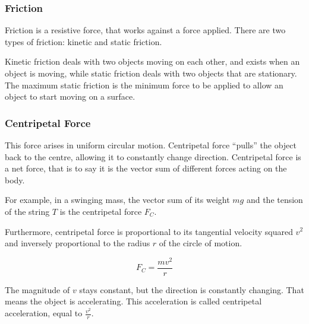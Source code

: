 \documentclass[../main.tex]{subfiles}
\begin{document}
			\subsubsection{Friction}
			Friction is a resistive force, that works against a force applied. There are two types of friction: kinetic and static friction. 
			
			Kinetic friction deals with two objects moving on each other, and exists when an object is moving, while static friction deals with two objects that are stationary. The maximum static friction is the minimum force to be applied to allow an object to start moving on a surface.
			\begin{center}
			\end{center}
		
			\subsubsection{Centripetal Force}
			
			This force arises in uniform circular motion. Centripetal force ``pulls'' the object back to the centre, allowing it to constantly change direction. Centripetal force is a net force, that is to say it is the vector sum of different forces acting on the body.

			For example, in a swinging mass, the vector sum of its weight \(mg\) and the tension of the string \(T\) is the centripetal force \(F_C\).

			Furthermore, centripetal force is proportional to its tangential velocity squared \(v^2\)and inversely proportional to the radius \(r\) of the circle of motion. 
			\begin{center}
			\end{center}
		
			\[F_C = \frac{mv^2}{r} \]
			
			The magnitude of \(v\) stays constant, but the direction is constantly changing. That means the object is accelerating. This acceleration is called centripetal acceleration, equal to \(\frac{v^2}{r}\).
\end{document}
